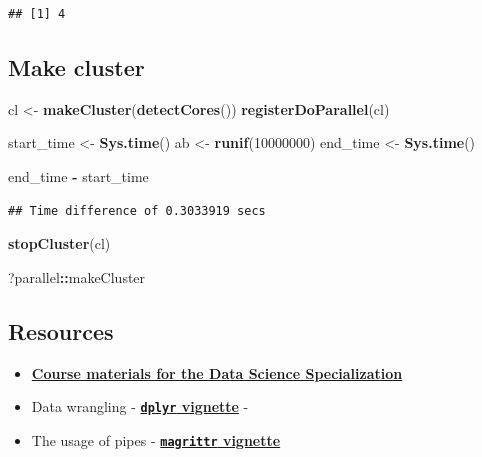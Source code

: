 \documentclass[10pt,]{article}
\newenvironment{Shaded}{\begin{snugshade}}{\end{snugshade}}
\newcommand{\KeywordTok}[1]{\textcolor[rgb]{0.13,0.29,0.53}{\textbf{#1}}}
\newcommand{\DecValTok}[1]{\textcolor[rgb]{0.00,0.00,0.81}{#1}}
\newcommand{\StringTok}[1]{\textcolor[rgb]{0.31,0.60,0.02}{#1}}
\newcommand{\OperatorTok}[1]{\textcolor[rgb]{0.81,0.36,0.00}{\textbf{#1}}}
\newcommand{\NormalTok}[1]{#1}
\providecommand{\tightlist}{%
  \setlength{\itemsep}{0pt}\setlength{\parskip}{0pt}}
\begin{document}
\begin{verbatim}
## [1] 4
\end{verbatim}

\subsection{Make cluster}\label{make-cluster}

\begin{Shaded}
\begin{Highlighting}[]
\NormalTok{cl <-}\StringTok{ }\KeywordTok{makeCluster}\NormalTok{(}\KeywordTok{detectCores}\NormalTok{())}
\KeywordTok{registerDoParallel}\NormalTok{(cl)}
\end{Highlighting}
\end{Shaded}

\begin{Shaded}
\begin{Highlighting}[]
\NormalTok{start_time <-}\StringTok{ }\KeywordTok{Sys.time}\NormalTok{()}
\NormalTok{ab <-}\StringTok{ }\KeywordTok{runif}\NormalTok{(}\DecValTok{10000000}\NormalTok{)}
\NormalTok{end_time <-}\StringTok{ }\KeywordTok{Sys.time}\NormalTok{()}

\NormalTok{end_time }\OperatorTok{-}\StringTok{ }\NormalTok{start_time}
\end{Highlighting}
\end{Shaded}

\begin{verbatim}
## Time difference of 0.3033919 secs
\end{verbatim}

\begin{Shaded}
\begin{Highlighting}[]
\KeywordTok{stopCluster}\NormalTok{(cl)}
\end{Highlighting}
\end{Shaded}

\begin{Shaded}
\begin{Highlighting}[]
\NormalTok{?parallel}\OperatorTok{::}\NormalTok{makeCluster}
\end{Highlighting}
\end{Shaded}

\subsection{Resources}\label{resources}

\begin{itemize}
\tightlist
\item
  \href{https://github.com/DataScienceSpecialization/courses}{\textbf{Course
  materials for the Data Science Specialization}}
\item
  Data wrangling -
  \href{https://cran.r-project.org/web/packages/dplyr/vignettes/dplyr.html}{\textbf{\texttt{dplyr}
  vignette}} -
\item
  The usage of pipes -
  \href{https://cran.r-project.org/web/packages/magrittr/vignettes/magrittr.html}{\textbf{\texttt{magrittr}
  vignette}} 
\end{itemize}
\end{document}
